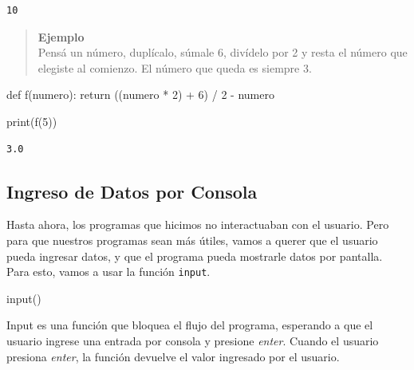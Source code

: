 \documentclass[
  letterpaper,
  DIV=11,
  numbers=noendperiod]{scrreprt}
\newenvironment{Shaded}{\begin{snugshade}}{\end{snugshade}}
\newcommand{\BuiltInTok}[1]{\textcolor[rgb]{0.00,0.23,0.31}{#1}}
\newcommand{\ControlFlowTok}[1]{\textcolor[rgb]{0.00,0.23,0.31}{#1}}
\newcommand{\DecValTok}[1]{\textcolor[rgb]{0.68,0.00,0.00}{#1}}
\newcommand{\KeywordTok}[1]{\textcolor[rgb]{0.00,0.23,0.31}{#1}}
\newcommand{\NormalTok}[1]{\textcolor[rgb]{0.00,0.23,0.31}{#1}}
\newcommand{\OperatorTok}[1]{\textcolor[rgb]{0.37,0.37,0.37}{#1}}
\begin{document}
\begin{verbatim}
10
\end{verbatim}

\begin{quote}
\textbf{Ejemplo}\\
Pensá un número, duplícalo, súmale 6, divídelo por 2 y resta el número
que elegiste al comienzo. El número que queda es siempre 3.
\end{quote}

\begin{Shaded}
\begin{Highlighting}[]
\KeywordTok{def}\NormalTok{ f(numero):}
  \ControlFlowTok{return}\NormalTok{ ((numero }\OperatorTok{*} \DecValTok{2}\NormalTok{) }\OperatorTok{+} \DecValTok{6}\NormalTok{) }\OperatorTok{/} \DecValTok{2} \OperatorTok{{-}}\NormalTok{ numero}
\end{Highlighting}
\end{Shaded}

\begin{Shaded}
\begin{Highlighting}[]
\BuiltInTok{print}\NormalTok{(f(}\DecValTok{5}\NormalTok{))}
\end{Highlighting}
\end{Shaded}

\begin{verbatim}
3.0
\end{verbatim}

\hypertarget{ingreso-de-datos-por-consola}{%
\subsection{Ingreso de Datos por
Consola}\label{ingreso-de-datos-por-consola}}

Hasta ahora, los programas que hicimos no interactuaban con el usuario.
Pero para que nuestros programas sean más útiles, vamos a querer que el
usuario pueda ingresar datos, y que el programa pueda mostrarle datos
por pantalla. Para esto, vamos a usar la función \texttt{input}.

\begin{Shaded}
\begin{Highlighting}[]
\BuiltInTok{input}\NormalTok{()}
\end{Highlighting}
\end{Shaded}

Input es una función que bloquea el flujo del programa, esperando a que
el usuario ingrese una entrada por consola y presione \emph{enter}.
Cuando el usuario presiona \emph{enter}, la función devuelve el valor
ingresado por el usuario.\\
\end{document}
